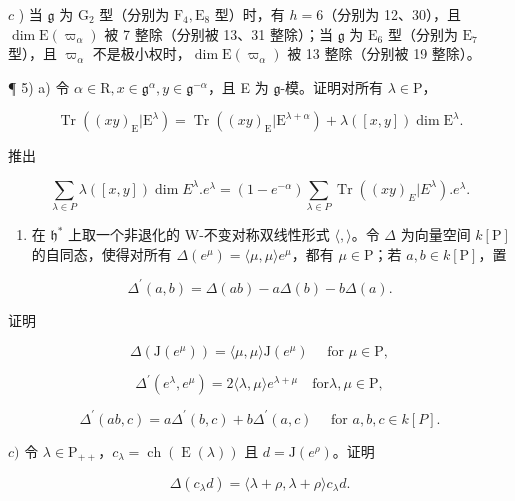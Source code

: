\(c\) ) 当 \(\mathfrak{g}\) 为 \(\mathrm{G}_2\) 型（分别为 \(\mathrm{F}_4,\mathrm{E}_8\) 型）时，有 \(h = 6\)（分别为 12、30），且 \(\dim \mathrm{E}(\varpi_{\alpha})\) 被 7 整除（分别被 13、31 整除）；当 \(\mathfrak{g}\) 为 \(\mathrm{E}_6\) 型（分别为 \(\mathrm{E}_7\) 型），且 \(\varpi_{\alpha}\) 不是极小权时，\(\dim \mathrm{E}(\varpi_{\alpha})\) 被 13 整除（分别被 19 整除）。

¶ 5) a) 令 \(\alpha \in \mathrm{R}, x \in \mathfrak{g}^{\alpha}, y \in \mathfrak{g}^{-\alpha}\)，且 E 为 \(\mathfrak{g}\)-模。证明对所有 \(\lambda \in \mathrm{P}\)，

\[
\operatorname{Tr} ((x y) _ {\mathrm{E}} | \mathrm{E} ^ {\lambda}) = \operatorname{Tr} ((x y) _ {\mathrm{E}} | \mathrm{E} ^ {\lambda + \alpha}) + \lambda ([ x, y ]) \dim \mathrm{E} ^ {\lambda}.
\]

推出

\[
\sum_ {\lambda \in P} \lambda ([ x, y ]) \dim E ^ {\lambda}. e ^ {\lambda} = (1 - e ^ {- \alpha}) \sum_ {\lambda \in P} \operatorname{Tr} ((x y) _ {E} | E ^ {\lambda}). e ^ {\lambda}.
\]

\begin{enumerate}
\def\labelenumi{\alph{enumi})}
\setcounter{enumi}{1}
\tightlist
\item
  在 \(\mathfrak{h}^*\) 上取一个非退化的 W-不变对称双线性形式 \(\langle ,\rangle\)。令 \(\Delta\) 为向量空间 \(k[\mathrm{P}]\) 的自同态，使得对所有 \(\Delta(e^{\mu}) = \langle \mu ,\mu \rangle e^{\mu}\)，都有 \(\mu \in \mathrm{P}\)；若 \(a,b\in k[\mathrm{P}]\)，置
\end{enumerate}

\[
\Delta^ {\prime} (a, b) = \Delta (a b) - a \Delta (b) - b \Delta (a).
\]

证明

\[
\Delta (\mathrm{J} (e ^ {\mu})) = \langle \mu , \mu \rangle \mathrm{J} (e ^ {\mu}) \quad \text { for } \mu \in \mathrm{P},
\]

\[
\Delta^ {\prime} (e ^ {\lambda}, e ^ {\mu}) = 2 \langle \lambda , \mu \rangle e ^ {\lambda + \mu} \quad \mathrm{for} \lambda , \mu \in \mathrm{P},
\]

\[
\Delta^ {\prime} (a b, c) = a \Delta^ {\prime} (b, c) + b \Delta^ {\prime} (a, c) \quad \text { for } a, b, c \in k [ P ].
\]

\(c)\) 令 \(\lambda \in \mathrm{P}_{++}\)，\(c_{\lambda} = \operatorname{ch}(\operatorname{E}(\lambda))\) 且 \(d = \mathrm{J}(e^{\rho})\)。证明

\[
\Delta (c _ {\lambda} d) = \langle \lambda + \rho , \lambda + \rho \rangle c _ {\lambda} d.
\]


